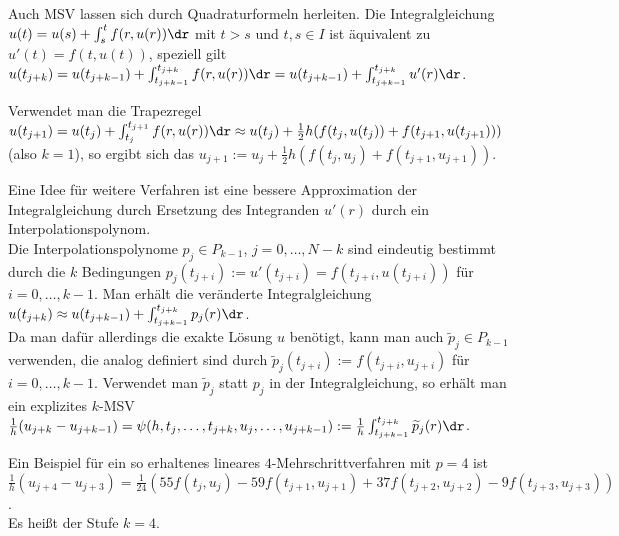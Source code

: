 \linie

\begin{Bem}
    Auch MSV lassen sich durch Quadraturformeln herleiten.
    Die Integralgleichung $u(t) = u(s) + \int_s^t f(r, u(r))\dr$ mit $t > s$
    und $t, s \in I$ ist äquivalent zu $u'(t) = f(t, u(t))$, speziell gilt
    $u(t_{j+k}) = u(t_{j+k-1}) + \int_{t_{j+k-1}}^{t_{j+k}} f(r, u(r))\dr =
    u(t_{j+k-1}) + \int_{t_{j+k-1}}^{t_{j+k}} u'(r)\dr$.
\end{Bem}

\begin{Bsp}
    Verwendet man die Trapezregel\\
    $u(t_{j+1}) = u(t_j) + \int_{t_j}^{t_{j+1}} f(r, u(r))\dr \approx
    u(t_j) + \frac{1}{2} h (f(t_j, u(t_j)) + f(t_{j+1}, u(t_{j+1})))$
    (also $k = 1$), so ergibt sich das 
    $u_{j+1} := u_j + \frac{1}{2} h (f(t_j, u_j) + f(t_{j+1}, u_{j+1}))$.
\end{Bsp}

\begin{Bem}
    Eine Idee für weitere Verfahren ist eine bessere Approximation der
    Integralgleichung durch Ersetzung des Integranden $u'(r)$ durch ein
    Interpolationspolynom.\\
    Die Interpolationspolynome $p_j \in P_{k-1}$, $j = 0, \dotsc, N - k$
    sind eindeutig bestimmt durch die $k$ Bedingungen
    $p_j(t_{j+i}) := u'(t_{j+i}) = f(t_{j+i}, u(t_{j+i}))$ für
    $i = 0, \dotsc, k - 1$.
    Man erhält die veränderte Integralgleichung
    $u(t_{j+k}) \approx u(t_{j+k-1}) +
    \int_{t_{j+k-1}}^{t_{j+k}} p_j(r)\dr$.\\
    Da man dafür allerdings die exakte Lösung $u$ benötigt, kann man auch
    $\widetilde{p}_j \in P_{k-1}$ verwenden, die analog definiert sind durch
    $\widetilde{p}_j(t_{j+i}) := f(t_{j+i}, u_{j+i})$ für
    $i = 0, \dotsc, k - 1$.
    Verwendet man $\widetilde{p}_j$ statt $p_j$ in der Integralgleichung,
    so erhält man ein explizites $k$-MSV\\
    $\frac{1}{h} (u_{j+k} - u_{j+k-1}) = \psi(h, t_j, \dotsc, t_{j+k},
    u_j, \dotsc, u_{j+k-1}) := \frac{1}{h}
    \int_{t_{j+k-1}}^{t_{j+k}} \widetilde{p}_j(r)\dr$.
\end{Bem}

\linie

\begin{Bsp}
    Ein Beispiel für ein so erhaltenes
    lineares $4$-Mehrschrittverfahren mit $p = 4$ ist\\
    $\frac{1}{h} (u_{j+4} - u_{j+3}) = \frac{1}{24}
    (55 f(t_j, u_j) - 59 f(t_{j+1}, u_{j+1}) + 37 f(t_{j+2}, u_{j+2}) -
    9 f(t_{j+3}, u_{j+3}))$.\\
    Es heißt  der
    Stufe $k = 4$.
\end{Bsp}

